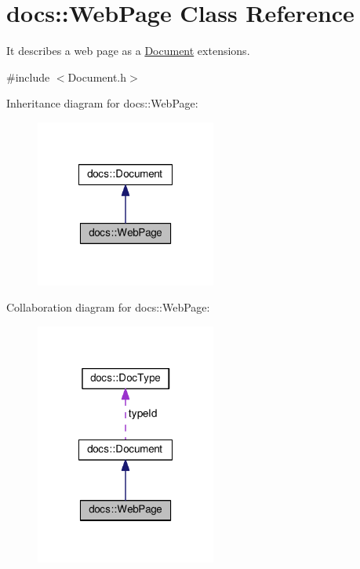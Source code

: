 \hypertarget{classdocs_1_1WebPage}{\section{docs\-:\-:Web\-Page Class Reference}
\label{classdocs_1_1WebPage}
}


It describes a web page as a \hyperlink{classdocs_1_1Document}{Document} extensions.  




{\ttfamily \#include $<$Document.\-h$>$}



Inheritance diagram for docs\-:\-:Web\-Page\-:\nopagebreak
\begin{figure}[H]
\begin{center}
\leavevmode
\includegraphics[width=168pt]{classdocs_1_1WebPage__inherit__graph}
\end{center}
\end{figure}


Collaboration diagram for docs\-:\-:Web\-Page\-:
\nopagebreak
\begin{figure}[H]
\begin{center}
\leavevmode
\includegraphics[width=168pt]{classdocs_1_1WebPage__coll__graph}
\end{center}
\end{figure}
